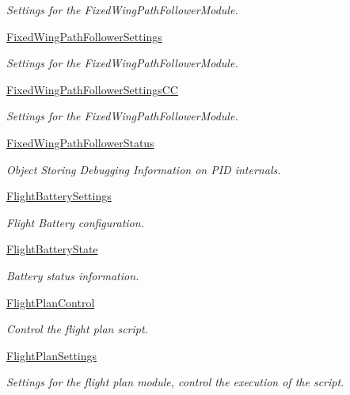 \begin{DoxyCompactItemize}
\begin{DoxyCompactList}\small\item\em \-Settings for the \-Fixed\-Wing\-Path\-Follower\-Module. \end{DoxyCompactList}\item 
\hyperlink{group___fixed_wing_path_follower_settings}{\-Fixed\-Wing\-Path\-Follower\-Settings}
\begin{DoxyCompactList}\small\item\em \-Settings for the \-Fixed\-Wing\-Path\-Follower\-Module. \end{DoxyCompactList}\item 
\hyperlink{group___fixed_wing_path_follower_settings_c_c}{\-Fixed\-Wing\-Path\-Follower\-Settings\-C\-C}
\begin{DoxyCompactList}\small\item\em \-Settings for the \-Fixed\-Wing\-Path\-Follower\-Module. \end{DoxyCompactList}\item 
\hyperlink{group___fixed_wing_path_follower_status}{\-Fixed\-Wing\-Path\-Follower\-Status}
\begin{DoxyCompactList}\small\item\em \-Object \-Storing \-Debugging \-Information on \-P\-I\-D internals. \end{DoxyCompactList}\item 
\hyperlink{group___flight_battery_settings}{\-Flight\-Battery\-Settings}
\begin{DoxyCompactList}\small\item\em \-Flight \-Battery configuration. \end{DoxyCompactList}\item 
\hyperlink{group___flight_battery_state}{\-Flight\-Battery\-State}
\begin{DoxyCompactList}\small\item\em \-Battery status information. \end{DoxyCompactList}\item 
\hyperlink{group___flight_plan_control}{\-Flight\-Plan\-Control}
\begin{DoxyCompactList}\small\item\em \-Control the flight plan script. \end{DoxyCompactList}\item 
\hyperlink{group___flight_plan_settings}{\-Flight\-Plan\-Settings}
\begin{DoxyCompactList}\small\item\em \-Settings for the flight plan module, control the execution of the script. \end{DoxyCompactList}\item 

\end{DoxyCompactItemize}
